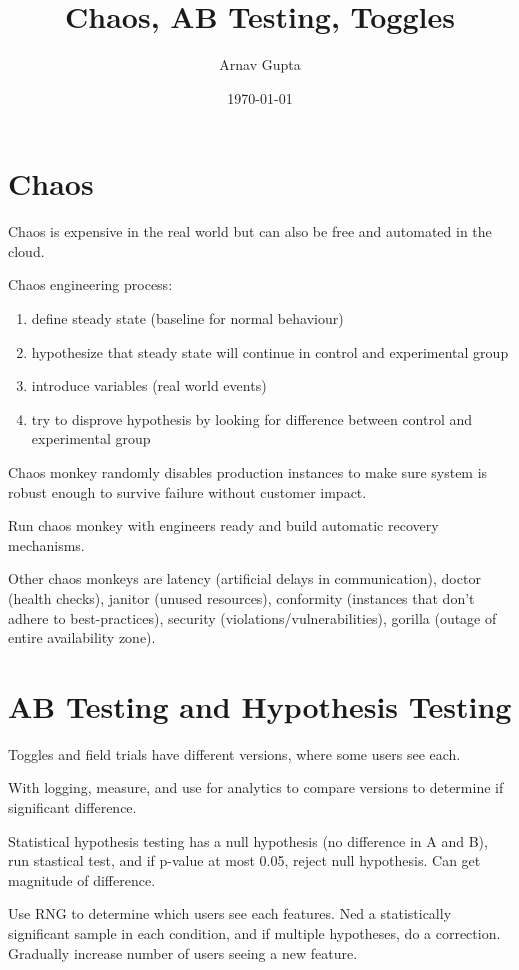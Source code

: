 \documentclass[11pt]{article}
\author{Arnav Gupta}
\date{\today}
\title{Chaos, AB Testing, Toggles}
\begin{document}
\maketitle
\tableofcontents

\section{Chaos}
\label{sec:org78d16ea}
Chaos is expensive in the real world but can also be free and automated in the cloud.

Chaos engineering process:
\begin{enumerate}
\item define steady state (baseline for normal behaviour)
\item hypothesize that steady state will continue in control and experimental group
\item introduce variables (real world events)
\item try to disprove hypothesis by looking for difference between control and experimental group
\end{enumerate}

Chaos monkey randomly disables production instances to make sure system is robust enough to survive
failure without customer impact.

Run chaos monkey with engineers ready and build automatic recovery mechanisms.

Other chaos monkeys are latency (artificial delays in communication), doctor (health checks),
janitor (unused resources), conformity (instances that don't adhere to best-practices),
security (violations/vulnerabilities), gorilla (outage of entire availability zone).
\section{AB Testing and Hypothesis Testing}
\label{sec:org15c33db}
Toggles and field trials have different versions, where some users see each.

With logging, measure, and use for analytics to compare versions to determine if significant difference.

Statistical hypothesis testing has a null hypothesis (no difference in A and B), run stastical test,
and if p-value at most 0.05, reject null hypothesis.
Can get magnitude of difference.

Use RNG to determine which users see each features.
Ned a statistically significant sample in each condition, and if multiple hypotheses, do a correction.
Gradually increase number of users seeing a new feature.
\end{document}

